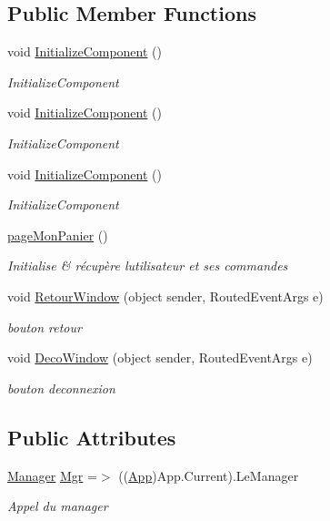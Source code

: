 \subsection*{Public Member Functions}
\begin{DoxyCompactItemize}
\item 
void \hyperlink{classnewPizza1_1_1pageMonPanier_af3487726644a638a98b47b824460a5f9}{Initialize\+Component} ()
\begin{DoxyCompactList}\small\item\em Initialize\+Component \end{DoxyCompactList}\item 
void \hyperlink{classnewPizza1_1_1pageMonPanier_af3487726644a638a98b47b824460a5f9}{Initialize\+Component} ()
\begin{DoxyCompactList}\small\item\em Initialize\+Component \end{DoxyCompactList}\item 
void \hyperlink{classnewPizza1_1_1pageMonPanier_af3487726644a638a98b47b824460a5f9}{Initialize\+Component} ()
\begin{DoxyCompactList}\small\item\em Initialize\+Component \end{DoxyCompactList}\item 
\hyperlink{classnewPizza1_1_1pageMonPanier_ab752a6df6a2baf4cac209d7ded9b8cb9}{page\+Mon\+Panier} ()
\begin{DoxyCompactList}\small\item\em Initialise \& récupère l\textquotesingle{}utilisateur et ses commandes \end{DoxyCompactList}\item 
void \hyperlink{classnewPizza1_1_1pageMonPanier_a38a35540b86440e0363db4da6b419c9b}{Retour\+Window} (object sender, Routed\+Event\+Args e)
\begin{DoxyCompactList}\small\item\em bouton retour \end{DoxyCompactList}\item 
void \hyperlink{classnewPizza1_1_1pageMonPanier_ae1cabba382a90962934b5b48aa31b235}{Deco\+Window} (object sender, Routed\+Event\+Args e)
\begin{DoxyCompactList}\small\item\em bouton deconnexion \end{DoxyCompactList}\end{DoxyCompactItemize}
\subsection*{Public Attributes}
\begin{DoxyCompactItemize}
\item 
\hyperlink{classModele_1_1Manager}{Manager} \hyperlink{classnewPizza1_1_1pageMonPanier_a65e53ed4bd6187ed6837b84fb1deddae}{Mgr} =$>$ ((\hyperlink{classnewPizza1_1_1App}{App})App.\+Current).Le\+Manager
\begin{DoxyCompactList}\small\item\em Appel du manager \end{DoxyCompactList}\end{DoxyCompactItemize}
